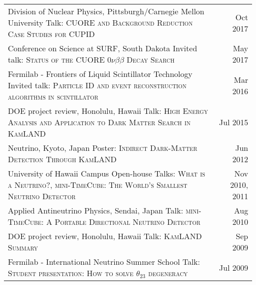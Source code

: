 \documentclass[10pt]{article} %
\begin{document}
\noindent\begin{tabularx}{\linewidth}{@{{}\textbullet\enskip}X@{\quad}r@{}}
	Division of Nuclear Physics, Pittsburgh/Carnegie Mellon University \newline Talk: \textsc{CUORE and Background Reduction Case Studies for CUPID} & Oct 2017 \\
	Conference on Science at SURF, South Dakota \newline Invited talk: \textsc{Status of the CUORE $0\nu\beta\beta$ Decay Search} & May 2017 \\
	Fermilab - Frontiers of Liquid Scintillator Technology \newline Invited talk: \textsc{Particle ID and event reconstruction algorithms in scintillator} & Mar 2016 \\
	DOE project review, Honolulu, Hawaii \newline Talk: \textsc{High Energy Analysis and Application to Dark Matter Search in KamLAND} & Jul 2015 \\
	Neutrino, Kyoto, Japan \newline Poster: \textsc{Indirect Dark-Matter Detection Through KamLAND} & Jun 2012 \\
	University of Hawaii Campus Open-house \newline Talks: \textsc{What is a Neutrino?}, \textsc{mini-TimeCube: The World's Smallest Neutrino Detector} & Nov 2010, 2011 \\
	Applied Antineutrino Physics, Sendai, Japan \newline Talk: \textsc{mini-TimeCube: A Portable Directional Neutrino Detector} & Aug 2010 \\
	DOE project review, Honolulu, Hawaii \newline Talk: \textsc{KamLAND Summary} & Sep 2009 \\
	Fermilab - International Neutrino Summer School \newline Talk: \textsc{Student presentation: How to solve $\theta_{23}$ degeneracy} & Jul 2009 \\
\end{tabularx}


\clearpage
\renewcommand\refname{Publications} %

\nocite{*} %

\end{document}
